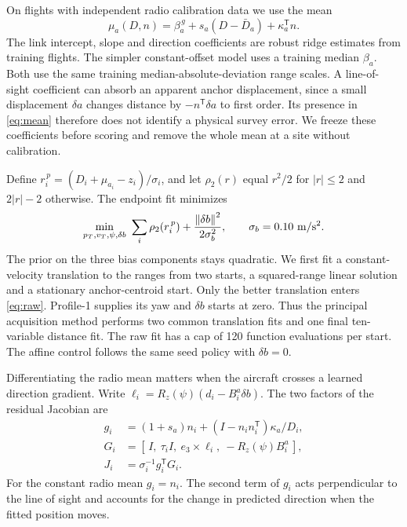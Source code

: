 \documentclass{IEEEtaes}
\newcommand{\rz}{R_z}
\newcommand{\norm}[1]{\left\lVert#1\right\rVert}
\newcommand{\trans}{^{\mathsf T}}
\begin{document}
On flights with independent radio calibration data we use the mean
\begin{equation}
 \mu_a(D,n)=\beta_a^{\,g}+s_a(D-\bar D_a)+\kappa_a\trans n .
 \label{eq:mean}
\end{equation}
The link intercept, slope and direction coefficients are robust ridge estimates from training flights. The simpler constant-offset model uses a training median \(\beta_a\). Both use the same training median-absolute-deviation range scales. A line-of-sight coefficient can absorb an apparent anchor displacement, since a small displacement \(\delta a\) changes distance by \(-n\trans\delta a\) to first order. Its presence in \eqref{eq:mean} therefore does not identify a physical survey error. We freeze these coefficients before scoring and remove the whole mean at a site without calibration.

Define \(r_i^{\,p}=(D_i+\mu_{a_i}-z_i)/\sigma_i\), and let \(\rho_2(r)\) equal \(r^2/2\) for \(|r|\le2\) and \(2|r|-2\) otherwise. The endpoint fit minimizes
\begin{equation}
 \min_{p_T,v_T,\psi,\delta b}\ \sum_i\rho_2(r_i^{\,p})+\frac{\norm{\delta b}^2}{2\sigma_b^2},
 \qquad \sigma_b=0.10\ {\rm m/s^2}. \label{eq:raw}
\end{equation}
The prior on the three bias components stays quadratic. We first fit a constant-velocity translation to the ranges from two starts, a squared-range linear solution and a stationary anchor-centroid start. Only the better translation enters \eqref{eq:raw}. Profile-1 supplies its yaw and \(\delta b\) starts at zero. Thus the principal acquisition method performs two common translation fits and one final ten-variable distance fit. The raw fit has a cap of 120 function evaluations per start. The affine control follows the same seed policy with \(\delta b=0\).

Differentiating the radio mean matters when the aircraft crosses a learned direction gradient. Write \(\ell_i=\rz(\psi)(d_i-B_i^a\delta b)\). The two factors of the residual Jacobian are
\begin{align}
 g_i &= (1+s_a)n_i+(I-n_i n_i\trans)\kappa_a/D_i,\nonumber\\
 G_i &= [\,I,\ \tau_i I,\ e_3\times\ell_i,\ -\rz(\psi)B_i^a\,],\nonumber\\
 J_i &= \sigma_i^{-1} g_i\trans G_i . \label{eq:jac}
\end{align}
For the constant radio mean \(g_i=n_i\). The second term of \(g_i\) acts perpendicular to the line of sight and accounts for the change in predicted direction when the fitted position moves.
\end{document}
